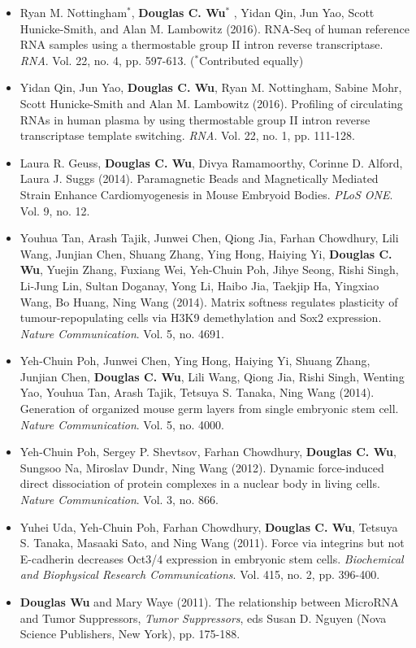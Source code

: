 \documentclass[dvips,11pt]{article}
\begin{document}
\begin{itemize}
	\setlength{\itemsep}{2pt}
	\item Ryan M. Nottingham$^*$, {\bf Douglas C. Wu$^*$} , Yidan Qin, Jun Yao, Scott Hunicke-Smith, and Alan M. Lambowitz (2016). RNA-Seq of human reference RNA samples using a thermostable group II intron reverse transcriptase. {\it RNA}. Vol. 22, no. 4, pp. 597-613. ($^*$Contributed equally)
	\item Yidan Qin, Jun Yao, {\bf Douglas C. Wu}, Ryan M. Nottingham, Sabine Mohr, Scott Hunicke-Smith and Alan M. Lambowitz (2016). Profiling of circulating RNAs in human plasma by using thermostable group II intron reverse transcriptase template switching. {\it RNA}. Vol. 22, no. 1, pp. 111-128.
	\item Laura R. Geuss, {\bf Douglas C. Wu}, Divya Ramamoorthy, Corinne D. Alford, Laura J. Suggs (2014). Paramagnetic Beads and Magnetically Mediated Strain Enhance Cardiomyogenesis in Mouse Embryoid Bodies. {\it  PLoS ONE}. Vol. 9, no. 12.
	\item Youhua Tan, Arash Tajik, Junwei Chen, Qiong Jia, Farhan Chowdhury, Lili Wang, Junjian Chen, Shuang Zhang, Ying Hong, Haiying Yi, {\bf Douglas C. Wu}, Yuejin Zhang, Fuxiang Wei, Yeh-Chuin Poh, Jihye Seong, Rishi Singh, Li-Jung Lin, Sultan Doganay, Yong Li, Haibo Jia, Taekjip Ha, Yingxiao Wang, Bo Huang, Ning Wang (2014). Matrix softness regulates plasticity of tumour-repopulating cells via H3K9 demethylation and Sox2 expression. {\it Nature Communication}. Vol. 5, no. 4691.
	\item Yeh-Chuin Poh, Junwei Chen, Ying Hong, Haiying Yi, Shuang Zhang, Junjian Chen, {\bf Douglas C. Wu}, Lili Wang, Qiong Jia, Rishi Singh, Wenting Yao, Youhua Tan, Arash Tajik, Tetsuya S. Tanaka, Ning Wang (2014). Generation of organized mouse germ layers from single embryonic stem cell. {\it Nature Communication}. Vol. 5, no. 4000.
	\item Yeh-Chuin Poh, Sergey P. Shevtsov, Farhan Chowdhury, { \bf Douglas C. Wu}, Sungsoo Na, Miroslav Dundr, Ning Wang (2012). Dynamic force-induced direct dissociation of protein complexes in a nuclear body in living cells. {\it Nature Communication}. Vol. 3, no. 866.
	\item Yuhei Uda, Yeh-Chuin Poh, Farhan Chowdhury, { \bf Douglas C. Wu}, Tetsuya S. Tanaka, Masaaki Sato, and Ning Wang (2011). Force via integrins but not E-cadherin decreases Oct3/4 expression in embryonic stem cells. {\it Biochemical and Biophysical Research Communications}. Vol. 415, no. 2, pp. 396-400.
	\item {\bf Douglas Wu} and Mary Waye (2011). The relationship between MicroRNA and Tumor Suppressors, {\it Tumor Suppressors}, eds Susan D. Nguyen (Nova Science Publishers, New York), pp. 175-188.
\end{itemize}
\end{document}
